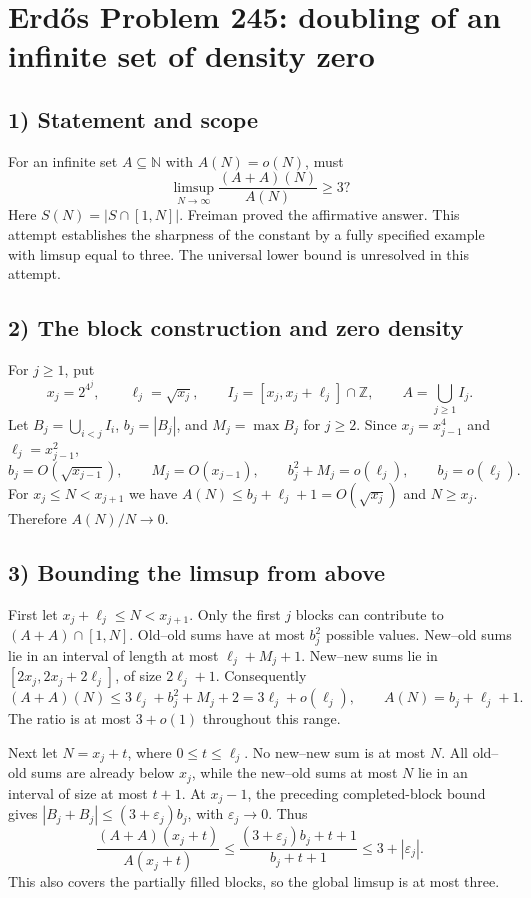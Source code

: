\section{Erd\H{o}s Problem 245: doubling of an infinite set of density zero}

\subsection{1) Statement and scope}
For an infinite set $A\subseteq\mathbb N$ with $A(N)=o(N)$,
must
\[
 \limsup_{N\to\infty}\frac{(A+A)(N)}{A(N)}\geq3?
\]
Here $S(N)=|S\cap[1,N]|$. Freiman proved the affirmative answer.
This attempt establishes the sharpness of the constant by a
fully specified example with limsup equal to three. The universal
lower bound is unresolved in this attempt.

\subsection{2) The block construction and zero density}
For $j\geq1$, put
\[
 x_j=2^{4^j},\qquad \ell_j=\sqrt{x_j},\qquad
 I_j=[x_j,x_j+\ell_j]\cap\mathbb Z,\qquad A=\bigcup_{j\geq1}I_j.
\]
Let $B_j=\bigcup_{i<j}I_i$, $b_j=|B_j|$, and
$M_j=\max B_j$ for $j\geq2$. Since
$x_j=x_{j-1}^4$ and $\ell_j=x_{j-1}^2$,
\[
 b_j=O(\sqrt{x_{j-1}}),\qquad
 M_j=O(x_{j-1}),\qquad
 b_j^2+M_j=o(\ell_j),\qquad b_j=o(\ell_j).
\]
For $x_j\leq N<x_{j+1}$ we have
$A(N)\leq b_j+\ell_j+1=O(\sqrt{x_j})$ and $N\geq x_j$.
Therefore $A(N)/N\to0$.

\subsection{3) Bounding the limsup from above}
First let $x_j+\ell_j\leq N<x_{j+1}$.
Only the first $j$ blocks can contribute to $(A+A)\cap[1,N]$.
Old--old sums have at most $b_j^2$ possible values.
New--old sums lie in an interval of length at most
$\ell_j+M_j+1$. New--new sums lie in
$[2x_j,2x_j+2\ell_j]$, of size $2\ell_j+1$.
Consequently
\[
 (A+A)(N)\leq 3\ell_j+b_j^2+M_j+2
             =3\ell_j+o(\ell_j),
 \qquad A(N)=b_j+\ell_j+1.
\]
The ratio is at most $3+o(1)$ throughout this range.

Next let $N=x_j+t$, where $0\leq t\leq\ell_j$.
No new--new sum is at most $N$. All old--old sums are already
below $x_j$, while the new--old sums at most $N$ lie in an
interval of size at most $t+1$. At $x_j-1$, the preceding
completed-block bound gives
$|B_j+B_j|\leq(3+\varepsilon_j)b_j$, with $\varepsilon_j\to0$.
Thus
\[
 \frac{(A+A)(x_j+t)}{A(x_j+t)}
 \leq\frac{(3+\varepsilon_j)b_j+t+1}{b_j+t+1}
 \leq3+|\varepsilon_j|.
\]
This also covers the partially filled blocks, so the global
limsup is at most three.

